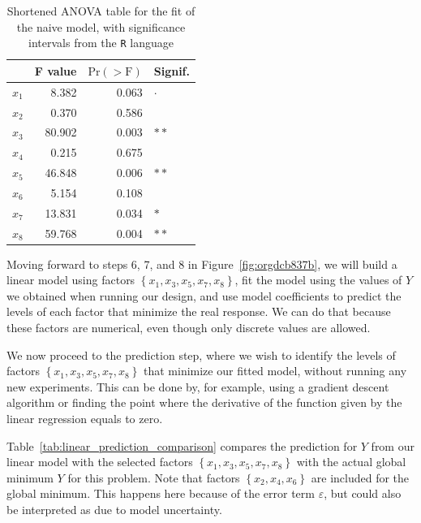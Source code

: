 \documentclass[conference]{IEEEtran}
\begin{document}
\begin{table}[t]
\centering
\caption{Shortened ANOVA table for the fit of the naive model, with significance intervals from the \texttt{R} language}
\label{tab:anova_linear}
\begingroup\small
\begin{tabular}{lrrl}
  \toprule
 & F value & $\text{Pr}(>\text{F})$ & Signif. \\
  \midrule
$x_1$ & 8.382 & 0.063 & $\cdot$ \\
  $x_2$ & 0.370 & 0.586 &   \\
  $x_3$ & 80.902 & 0.003 & $**$ \\
  $x_4$ & 0.215 & 0.675 &   \\
  $x_5$ & 46.848 & 0.006 & $**$ \\
  $x_6$ & 5.154 & 0.108 &   \\
  $x_7$ & 13.831 & 0.034 & $*$ \\
  $x_8$ & 59.768 & 0.004 & $**$ \\
   \bottomrule
\end{tabular}
\endgroup
\end{table}

Moving forward to steps 6, 7, and 8 in Figure~\ref{fig:orgdcb837b}, we
will build a linear model using factors \(\left\{x_1,x_3,x_5,x_7,x_8\right\}\),
fit the model using the values of \(Y\) we obtained when running our design, and
use model coefficients to predict the levels of each factor that minimize the
real response. We can do that because these factors are numerical, even though
only discrete values are allowed.

We now proceed to the prediction step, where we wish to identify the levels of
factors \(\left\{x_1,x_3,x_5,x_7,x_8\right\}\) that minimize our fitted model,
without running any new experiments. This can be done by, for example, using a
gradient descent algorithm or finding the point where the derivative of the
function given by the linear regression equals to zero.

Table~\ref{tab:linear_prediction_comparison} compares the prediction for
\(Y\) from our linear model with the selected factors
\(\left\{x_1,x_3,x_5,x_7,x_8\right\}\) with the actual global minimum \(Y\) for this
problem. Note that factors \(\left\{x_2,x_4,x_6\right\}\) are included for the
global minimum. This happens here because of the error term \(\varepsilon\), but
could also be interpreted as due to model uncertainty.
\end{document}
